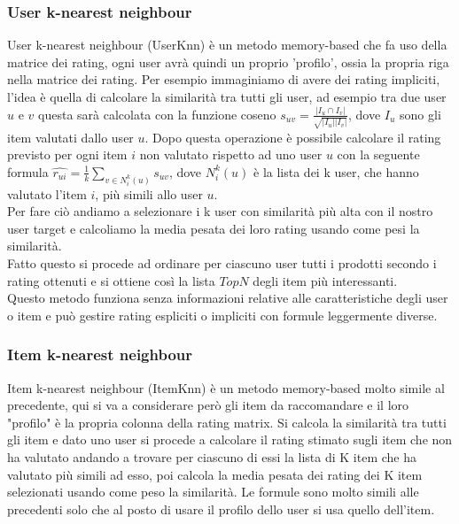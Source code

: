 \subsubsection{User k-nearest neighbour}
User k-nearest neighbour (UserKnn) è un metodo memory-based che fa uso della matrice dei rating, ogni user avrà quindi un proprio 'profilo', ossia la propria riga nella matrice dei rating. 
Per esempio immaginiamo di avere dei rating impliciti, l'idea è quella di calcolare la similarità tra tutti gli user, ad esempio tra due user $u$ e $v$ questa sarà calcolata con la funzione coseno $s_{uv} = \frac{|I_{u} \cap I_{v}|}{\sqrt{|I_{u}||I_{v}|}}$, dove $I_u$ sono gli item valutati dallo user $u$. Dopo questa operazione è possibile calcolare il rating previsto per ogni item $i$ non valutato rispetto ad uno user $u$ con la seguente formula $\hat{r_{ui}} = \frac{1}{k} \sum_{v\in N_{i}^k(u)} s_{uv}$, dove $N_{i}^k(u)$ è la lista dei k user, che hanno valutato l'item $i$, più simili allo user $u$.\\
Per fare ciò andiamo a selezionare i k user con similarità più alta con il nostro user target e calcoliamo la media pesata dei loro rating usando come pesi la similarità.\\
Fatto questo si procede ad ordinare per ciascuno user tutti i prodotti secondo i rating ottenuti e si ottiene così la lista $TopN$ degli item più interessanti.\\
Questo metodo funziona senza informazioni relative alle caratteristiche degli user o item e può gestire rating espliciti o impliciti con formule leggermente diverse.

\subsubsection{Item k-nearest neighbour}
Item k-nearest neighbour (ItemKnn) è un metodo memory-based molto simile al precedente, qui si va a considerare però gli item da raccomandare e il loro "profilo" è la propria colonna della rating matrix. Si calcola la similarità tra tutti gli item e dato uno user si procede a calcolare il rating stimato sugli item che non ha valutato andando a trovare per ciascuno di essi la lista di K item che ha valutato più simili ad esso, poi calcola la media pesata dei rating dei K item selezionati usando come peso la similarità. Le formule sono molto simili alle precedenti solo che al posto di usare il profilo dello user si usa quello dell'item.
 
